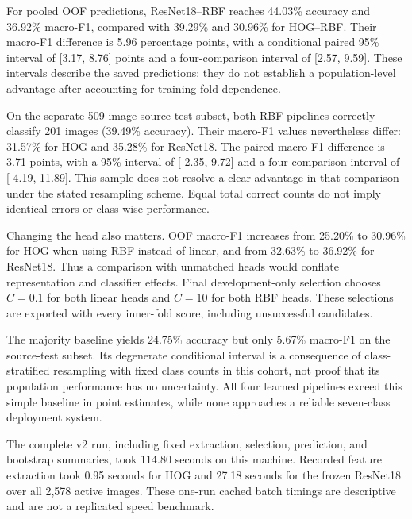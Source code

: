 For pooled OOF predictions, ResNet18--RBF reaches 44.03\% accuracy and 36.92\%
macro-F1, compared with 39.29\% and 30.96\% for HOG--RBF. Their macro-F1
difference is 5.96 percentage points, with a conditional paired 95\% interval
of [3.17, 8.76] points and a four-comparison interval of [2.57, 9.59].
These intervals describe the saved predictions; they do not establish a
population-level advantage after accounting for training-fold dependence.

On the separate 509-image source-test subset, both RBF pipelines correctly
classify 201 images (39.49\% accuracy). Their macro-F1 values nevertheless
differ: 31.57\% for HOG and 35.28\% for ResNet18. The paired macro-F1 difference
is 3.71 points, with a 95\% interval of [-2.35, 9.72] and a four-comparison
interval of [-4.19, 11.89]. This sample does not resolve a clear advantage in
that comparison under the stated resampling scheme. Equal total correct counts
do not imply identical errors or class-wise performance.

Changing the head also matters. OOF macro-F1 increases from 25.20\% to 30.96\%
for HOG when using RBF instead of linear, and from 32.63\% to 36.92\% for
ResNet18. Thus a comparison with unmatched heads would conflate representation
and classifier effects. Final development-only selection chooses $C=0.1$ for
both linear heads and $C=10$ for both RBF heads. These selections are exported
with every inner-fold score, including unsuccessful candidates.

The majority baseline yields 24.75\% accuracy but only 5.67\% macro-F1 on the
source-test subset. Its degenerate conditional interval is a consequence of
class-stratified resampling with fixed class counts in this cohort, not proof
that its population performance has no uncertainty. All four learned pipelines
exceed this simple baseline in point estimates, while none approaches a reliable
seven-class deployment system.

The complete v2 run, including fixed extraction, selection, prediction, and
bootstrap summaries, took 114.80 seconds on this machine. Recorded feature
extraction took 0.95 seconds for HOG and 27.18 seconds for the frozen ResNet18
over all 2,578 active images. These one-run cached batch timings are descriptive
and are not a replicated speed benchmark.
